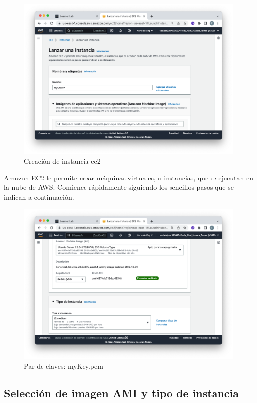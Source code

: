 \begin{figure}[h]
	\centering
	\includegraphics[scale=.3] {img/01}
	\caption{Creación de instancia ec2}
	\label{fig:1}	
\end{figure} 

Amazon EC2 le permite crear máquinas virtuales, o instancias, que se ejecutan en la nube de AWS. Comience rápidamente siguiendo los sencillos pasos que se indican a continuación.

\begin{figure}[h]
	\centering
	\includegraphics[scale=.3] {img/02}
	\caption{Par de claves: myKey.pem}
	\label{fig:2}	
\end{figure} 


\clearpage

\subsection{Selección de imagen AMI y tipo de instancia}

